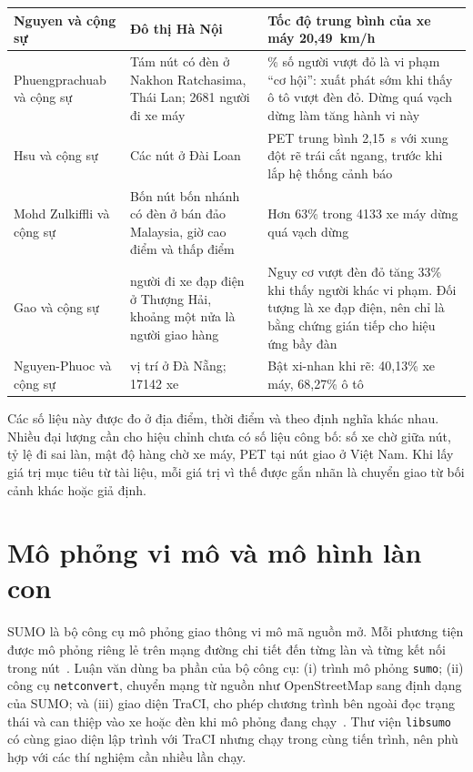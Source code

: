 \documentclass[../main.tex]{subfiles}
\begin{document}
\begin{longtable}{|>{\raggedright\arraybackslash}p{3.1cm}|>{\raggedright\arraybackslash}p{3.4cm}|>{\raggedright\arraybackslash}p{7.1cm}|}
\hline
Nguyen và cộng sự~\cite{nguyen2022motorcycles} & Đô thị Hà Nội & Tốc độ trung bình của xe máy 20,49~km/h \\
\hline
Phuengprachuab và cộng sự~\cite{phuengprachuab2023opportunistic} & Tám nút có đèn ở Nakhon Ratchasima, Thái Lan; 2681 người đi xe máy & 61\% số người vượt đỏ là vi phạm ``cơ hội'': xuất phát sớm khi thấy ô tô vượt đèn đỏ. Dừng quá vạch dừng làm tăng hành vi này \\
\hline
Hsu và cộng sự~\cite{hsu2024v2x} & Các nút ở Đài Loan & PET trung bình 2,15~s với xung đột rẽ trái cắt ngang, trước khi lắp hệ thống cảnh báo \\
\hline
Mohd Zulkiffli và cộng sự~\cite{zulkiffli2023stopping} & Bốn nút bốn nhánh có đèn ở bán đảo Malaysia, giờ cao điểm và thấp điểm & Hơn 63\% trong 4133 xe máy dừng quá vạch dừng \\
\hline
Gao và cộng sự~\cite{gao2020redlight} & 2173 người đi xe đạp điện ở Thượng Hải, khoảng một nửa là người giao hàng & Nguy cơ vượt đèn đỏ tăng 33\% khi thấy người khác vi phạm. Đối tượng là xe đạp điện, nên chỉ là bằng chứng gián tiếp cho hiệu ứng bầy đàn \\
\hline
Nguyen-Phuoc và cộng sự~\cite{nguyenphuoc2019turnsignal} & 24 vị trí ở Đà Nẵng; 17142 xe & Bật xi-nhan khi rẽ: 40,13\% xe máy, 68,27\% ô tô \\
\hline
\end{longtable}
\endgroup

Các số liệu này được đo ở địa điểm, thời điểm và theo định nghĩa khác nhau. Nhiều đại lượng cần cho hiệu chỉnh chưa có số liệu công bố: số xe chờ giữa nút, tỷ lệ đi sai làn, mật độ hàng chờ xe máy, PET tại nút giao ở Việt Nam. Khi lấy giá trị mục tiêu từ tài liệu, mỗi giá trị vì thế được gắn nhãn là chuyển giao từ bối cảnh khác hoặc giả định.

\section{Mô phỏng vi mô và mô hình làn con}
\label{section:2.sumo}
\label{subsection:2.1.1}

SUMO là bộ công cụ mô phỏng giao thông vi mô mã nguồn mở. Mỗi phương tiện được mô phỏng riêng lẻ trên mạng đường chi tiết đến từng làn và từng kết nối trong nút~\cite{lopez2018sumo}. Luận văn dùng ba phần của bộ công cụ: (i) trình mô phỏng \texttt{sumo}; (ii) công cụ \texttt{netconvert}, chuyển mạng từ nguồn như OpenStreetMap sang định dạng của SUMO; và (iii) giao diện TraCI, cho phép chương trình bên ngoài đọc trạng thái và can thiệp vào xe hoặc đèn khi mô phỏng đang chạy~\cite{lopez2018sumo}. Thư viện \texttt{libsumo} có cùng giao diện lập trình với TraCI nhưng chạy trong cùng tiến trình, nên phù hợp với các thí nghiệm cần nhiều lần chạy.
\end{document}
